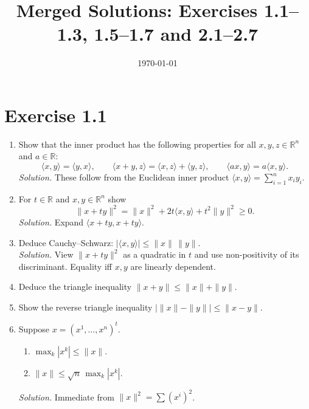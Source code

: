\documentclass[11pt,a4paper]{article}
\title{Merged Solutions: Exercises 1.1--1.3, 1.5--1.7 and 2.1--2.7}
\author{}
\date{\today}
\begin{document}
	\maketitle
	
	\section*{Exercise 1.1}
	\begin{enumerate}[label=\alph*)]   %
		\item Show that the inner product has the following properties for all $x,y,z\in\mathbb{R}^n$ and $a\in\mathbb{R}$:
		\[
		\langle x,y\rangle=\langle y,x\rangle,\qquad
		\langle x+y,z\rangle=\langle x,z\rangle+\langle y,z\rangle,\qquad
		\langle ax,y\rangle=a\langle x,y\rangle.
		\]
		\textit{Solution.} These follow from the Euclidean inner product $\langle x,y\rangle=\sum_{i=1}^n x_i y_i$.
		
		\item For $t\in\mathbb{R}$ and $x,y\in\mathbb{R}^n$ show
		\[
		\|x+ty\|^2=\|x\|^2+2t\langle x,y\rangle+t^2\|y\|^2\ge 0.
		\]
		\textit{Solution.} Expand $\langle x+ty,x+ty\rangle$.
		
		\item Deduce Cauchy--Schwarz: $|\langle x,y\rangle|\le \|x\|\,\|y\|$.\\
		\textit{Solution.} View $\|x+ty\|^2$ as a quadratic in $t$ and use non-positivity of its discriminant.
		Equality iff $x,y$ are linearly dependent.
		
		\item Deduce the triangle inequality $\|x+y\|\le \|x\|+\|y\|$.
		
		\item Show the reverse triangle inequality $|\|x\|-\|y\||\le \|x-y\|$.
		
		\item Suppose $x=(x^1,\dots,x^n)^t$.
		\begin{enumerate}[label=\roman*)]   %
			\item $\displaystyle \max_{k}|x^k|\le \|x\|$.
			\item $\displaystyle \|x\|\le \sqrt{n}\,\max_{k}|x^k|$.
		\end{enumerate}
		\textit{Solution.} Immediate from $\|x\|^2=\sum (x^i)^2$.
	\end{enumerate}
\end{document}
